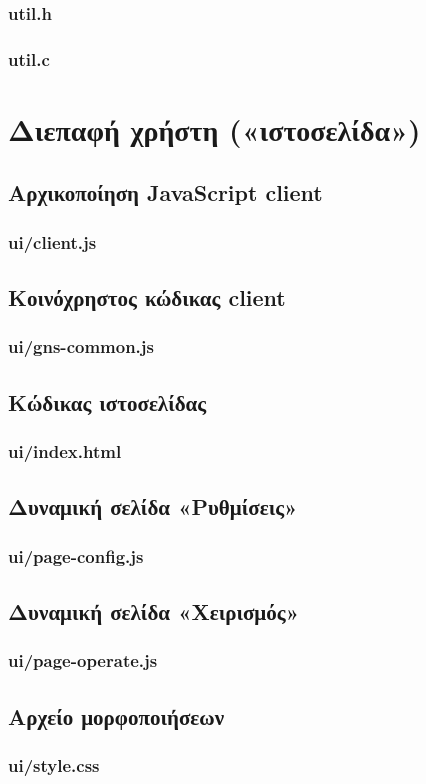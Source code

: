 \subsubsection*{util.h}

\subsubsection*{util.c}



\section{Διεπαφή χρήστη («ιστοσελίδα»)}


\subsection*{Αρχικοποίηση JavaScript client}
\subsubsection*{ui/client.js}



\subsection*{Κοινόχρηστος κώδικας client}
\subsubsection*{ui/gns-common.js}



\subsection*{Κώδικας ιστοσελίδας}
\subsubsection*{ui/index.html}



\subsection*{Δυναμική σελίδα «Ρυθμίσεις»}
\subsubsection*{ui/page-config.js}



\subsection*{Δυναμική σελίδα «Χειρισμός»}
\subsubsection*{ui/page-operate.js}



\subsection*{Αρχείο μορφοποιήσεων}
\subsubsection*{ui/style.css}

